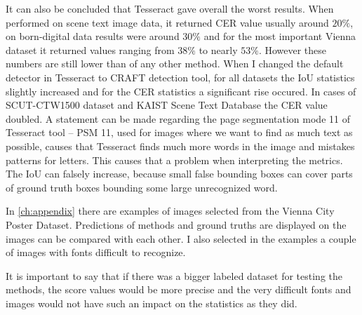 It can also be concluded that Tesseract gave overall the worst results. When performed on scene text image data, it returned CER value usually around $20\%$, on born-digital data results were around $30\%$ and for the most important Vienna dataset it returned values ranging from $38\%$ to nearly $53\%$. However these numbers are still lower than of any other method. When I changed the default detector in Tesseract to CRAFT detection tool, for all datasets the IoU statistics slightly increased and for the CER statistics a significant rise occured. In cases of SCUT-CTW1500 dataset and KAIST Scene Text Database the CER value doubled. A statement can be made regarding the page segmentation mode 11 of Tesseract tool -- PSM 11, used for images where we want to find as much text as possible, causes that Tesseract finds  much more words in the image and mistakes patterns for letters. This causes that a problem when interpreting the metrics. The IoU can falsely increase, because small false bounding boxes can cover parts of ground truth boxes bounding some large unrecognized word.

In \ref*{ch:appendix} there are examples of images selected from the Vienna City Poster Dataset. Predictions of methods and ground truths are displayed on the images can be compared with each other. I also selected in the examples a couple of images with fonts difficult to recognize.

It is important to say that if there was a bigger labeled dataset for testing the methods, the score values would be more precise and the very difficult fonts and images would not have such an impact on the statistics as they did.